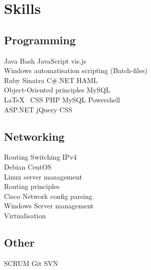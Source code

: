 \documentclass[a4paper]{deedy-resume} %
\begin{document}
\begin{minipage}[t]{0.33\textwidth} %


\section{Skills}

\subsection{Programming}

Java \textbullet{} Bash \textbullet{} JavaScript\textbullet{} vis.js \\ Windows automatisation scripting (Batch-files) \\ 
Ruby \textbullet{} Sinatra \textbullet{} C\#.NET  \textbullet{} HAML \\ Object-Oriented principles \textbullet{} MySQL \\

\vspace{\topsep} %
\LaTeX\ \textbullet{} CSS \textbullet{} PHP \textbullet{} MySQL \textbullet{} Powershell \\
ASP.NET \textbullet{} jQuery \textbullet CSS 

\sectionspace %

\subsection{Networking}

Routing \textbullet{} Switching \textbullet{} IPv4 \\ 
Debian \textbullet{} CentOS \\ Linux server management \\ Routing principles \\ Cisco \textbullet{} Network config parsing \\ Windows Server management \\ Virtualisation \\

\sectionspace %

\subsection{Other}
SCRUM \textbullet{} Git \textbullet{} SVN \\


\end{minipage}
\end{document}
